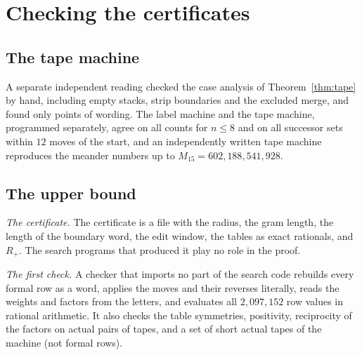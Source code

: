 \section{Checking the certificates}\label{sec:checks}

\subsection{The tape machine}

A separate independent reading checked the case analysis of Theorem~\ref{thm:tape} by hand, including empty stacks,
strip boundaries and the excluded merge, and found only points of wording. The label machine and the tape machine,
programmed separately, agree on all counts for $n\le8$ and on all successor sets within $12$ moves of the start, and
an independently written tape machine reproduces the meander numbers up to $M_{15}=602{,}188{,}541{,}928$.

\subsection{The upper bound}

\emph{The certificate.} The certificate is a file with the radius, the gram length, the length of the boundary word,
the edit window, the tables as exact rationals, and $R_+$. The search programs that produced it play no role in the
proof.

\emph{The first check.} A checker that imports no part of the search code rebuilds every formal row as a word, applies
the moves and their reverses literally, reads the weights and factors from the letters, and evaluates all
$2{,}097{,}152$ row values in rational arithmetic. It also checks the table symmetries, positivity, reciprocity of the
factors on actual pairs of tapes, and a set of short actual tapes of the machine (not formal rows).

